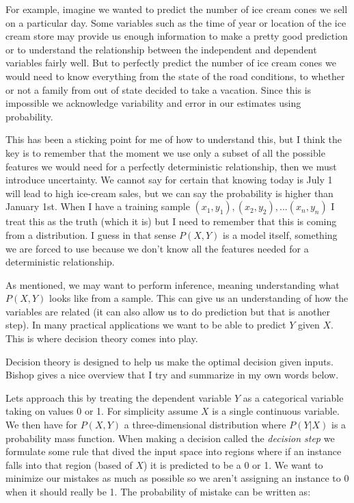 \documentclass[paper=a4, fontsize=11pt]{scrartcl} %
\numberwithin{equation}{section} %
\numberwithin{figure}{section} %
\numberwithin{table}{section} %
\begin{document}
For example, imagine we wanted to predict the number of ice cream cones we sell on a particular day. Some variables such as the time of year or location of the ice cream store may provide us enough information to make a pretty good prediction or to understand the relationship between the independent and dependent variables fairly well. But to perfectly predict the number of ice cream cones we would need to know everything from the state of the road conditions, to whether or not a family from out of state decided to take a vacation. Since this is impossible we acknowledge variability and error in our estimates using probability.

This has been a sticking point for me of how to understand this, but I think the key is to remember that the moment we use only a subset of all the possible features we would need for a perfectly deterministic relationship, then we must introduce uncertainty. We cannot say for certain that knowing today is July 1 will lead to high ice-cream sales, but we can say the probability is higher than January 1st. When I have a training sample $(x_1, y_1), (x_2, y_2), ... (x_n, y_n)$ I treat this as the truth (which it is) but I need to remember that this is coming from a distribution. I guess in that sense $P(X,Y)$ is a model itself, something we are forced to use because we don't know all the features needed for a deterministic relationship.

As mentioned, we may want to perform inference, meaning understanding what $P(X,Y)$ looks like from a sample.  This can give us an understanding of how the variables are related (it can also allow us to do prediction but that is another step). In many practical applications we want to be able to predict $Y$ given $X$. This is where decision theory comes into play.

Decision theory is designed to help us make the optimal decision given inputs. Bishop gives a nice overview that I try and summarize in my own words below.

Lets approach this by treating the dependent variable $Y$ as a categorical variable taking on values 0 or 1. For simplicity assume $X$ is a single continuous variable. We then have for $P(X,Y)$ a three-dimensional distribution where $P(Y|X)$ is a probability mass function. When making a decision called the \emph{decision step} we formulate some rule that dived the input space into regions where if an instance falls into that region (based of $X$) it is predicted to be a 0 or 1. We want to minimize our mistakes as much as possible so we aren't assigning an instance to 0 when it should really be 1. The probability of mistake can be written as:
\end{document}
